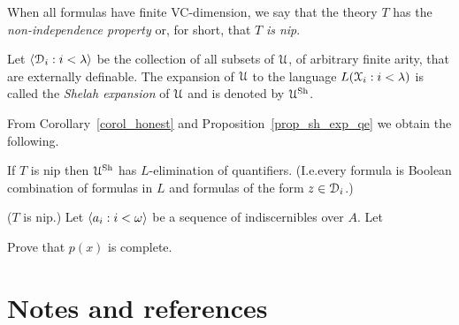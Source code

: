 When all formulas have finite VC-dimension, we say that the theory $T$ has the \emph{non-independence property\/} or, for short, that $T$ \emph{is nip}.

Let $\langle\EuScript D_i:i<\lambda\rangle$ be the collection of all subsets of $\EuScript U$, of arbitrary finite arity, that are externally definable. The expansion of $\EuScript U$ to the language $L(\EuScript X_i:i<\lambda)$ is called the \emph{Shelah expansion\/} of $\EuScript U$ and is denoted by \emph{$\EuScript U^{\rm Sh}$}. 

From Corollary~\ref{corol_honest} and Proposition~\ref{prop_sh_exp_qe} we obtain the following.

\begin{corollary}\label{corol_sh_exp_qe}
If $T$ is nip then $\EuScript U^{\rm Sh}$ has $L$-elimination of quantifiers. (I.e.\@ every formula is Boolean combination of formulas in $L$ and formulas of the form $z\in\EuScript D_i$.)
\end{corollary}

\begin{exercise}
  ($T$ is nip.)
  Let $\langle a_i:i<\omega\rangle$ be a sequence of indiscernibles over $A$.
  Let 
  

  Prove that $p(x)$ is complete.
\end{exercise}




\section{Notes and references}
\begin{biblist}[]\normalsize
{}\smallskip
\end{biblist}